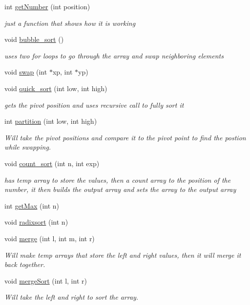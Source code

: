 \begin{DoxyCompactItemize}
int \mbox{\hyperlink{classproj4_a03877ba5b77cc470509002a5df7e94fe}{get\+Number}} (int position)
\begin{DoxyCompactList}\small\item\em just a function that shows how it is working \end{DoxyCompactList}\item 
void \mbox{\hyperlink{classproj4_aee6e853c25f60b77413edf9d0cf19470}{bubble\+\_\+sort}} ()
\begin{DoxyCompactList}\small\item\em uses two for loops to go through the array and swap neighboring elements \end{DoxyCompactList}\item 
void \mbox{\hyperlink{classproj4_a5742145f4cf42d5054e2621161252872}{swap}} (int $\ast$xp, int $\ast$yp)
\item 
void \mbox{\hyperlink{classproj4_ab413a8d7e60015de7a27dc0817a1a655}{quick\+\_\+sort}} (int low, int high)
\begin{DoxyCompactList}\small\item\em gets the pivot position and uses recursive call to fully sort it \end{DoxyCompactList}\item 
int \mbox{\hyperlink{classproj4_a26fd85cdceb9263023c66f6444d1282d}{partition}} (int low, int high)
\begin{DoxyCompactList}\small\item\em Will take the pivot positions and compare it to the pivot point to find the postion while swapping. \end{DoxyCompactList}\item 
void \mbox{\hyperlink{classproj4_a409353e4232f280b43a76e3bd9276cff}{count\+\_\+sort}} (int n, int exp)
\begin{DoxyCompactList}\small\item\em has temp array to store the values, then a count array to the position of the number, it then builds the output array and sets the array to the output array \end{DoxyCompactList}\item 
int \mbox{\hyperlink{classproj4_a5268b0050f09ac4db2896a39e2ea850d}{get\+Max}} (int n)
\item 
void \mbox{\hyperlink{classproj4_a612801aac2ccf7f3ed1176a3c2a1d938}{radixsort}} (int n)
\item 
void \mbox{\hyperlink{classproj4_a21e0a4c4dd81cf67a25d0ab62370ab5e}{merge}} (int l, int m, int r)
\begin{DoxyCompactList}\small\item\em Will make temp arrays that store the left and right values, then it will merge it back together. \end{DoxyCompactList}\item 
void \mbox{\hyperlink{classproj4_a9773d2125c6c8ccebf1f7e4932ee4e71}{merge\+Sort}} (int l, int r)
\begin{DoxyCompactList}\small\item\em Will take the left and right to sort the array. \end{DoxyCompactList}\end{DoxyCompactItemize}


